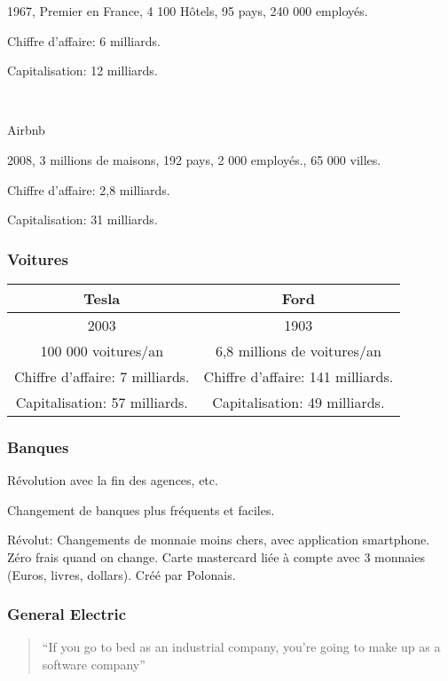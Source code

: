 \documentclass[a4paper,11pt]{article}
\begin{document}
1967, Premier en France, 4 100 Hôtels, 95 pays, 240 000 employés.

Chiffre d'affaire: 6 milliards.

Capitalisation: 12 milliards.

\

Airbnb

2008, 3 millions de maisons, 192 pays, 2 000 employés., 65 000 villes.

Chiffre d'affaire: 2,8 milliards.

Capitalisation: 31 milliards.

\subsubsection{Voitures}

\begin{center}
  \begin{tabular}{|c|c|}
    \hline
    Tesla & Ford \\
    \hline
    2003 & 1903\\
    100 000 voitures/an & 6,8 millions de voitures/an\\
    Chiffre d'affaire: 7 milliards. & Chiffre d'affaire: 141 milliards.\\
    Capitalisation: 57 milliards. & Capitalisation: 49 milliards.\\
    \hline
\end{tabular}
\end{center}

\subsubsection{Banques}

Révolution avec la fin des agences, etc.

Changement de banques plus fréquents et faciles.

Révolut: Changements de monnaie moins chers, avec application smartphone. Zéro
frais quand on change. Carte mastercard liée à compte avec 3 monnaies (Euros,
livres, dollars). Créé par Polonais.

\subsubsection{General Electric}

\begin{quote}
``If you go to bed as an industrial company, you're going to make up as a
software company''
\end{quote}
\end{document}
